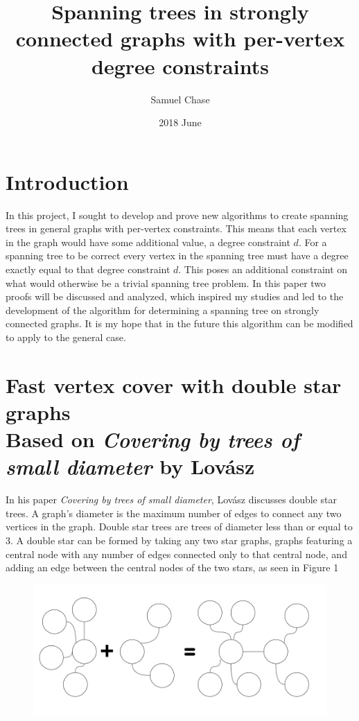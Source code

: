 \documentclass{article}
\title{Spanning trees in strongly connected graphs with per-vertex degree constraints}
\date{2018 June}
\author{Samuel Chase}
\begin{document}
	\maketitle
	\section{Introduction}
	In this project, I sought to develop and prove new algorithms to create spanning trees in general graphs with per-vertex constraints. 
	This means that each vertex in the graph would have some additional value, a degree constraint $d$. For a spanning tree to be correct every vertex in the spanning tree must have a degree exactly equal to that degree constraint $d$. This poses an additional constraint on what
	would otherwise be a trivial spanning tree problem. In this paper two proofs will be discussed and analyzed, which inspired my studies and led to the development of the algorithm for determining a spanning tree on strongly connected graphs. It is my hope that in the future this algorithm can be modified to apply to the general case.
	
	
	
	\section{Fast vertex cover with double star graphs \\ {\large Based on \textit{Covering by trees of small diameter} by Lov\'asz}}
	In his paper \textit{Covering by trees of small diameter}, Lov\'asz discusses double star trees. A graph's diameter is the maximum number of edges to connect any two vertices in the graph. Double star trees are trees of diameter less than or equal to 3. A double star can be formed by taking any two star graphs, graphs featuring a central node with any number of edges connected only to that central node, and adding an edge between the central nodes of the two stars, as seen in Figure 1
	\begin{figure}[h]
		\caption{}
		\includegraphics{Figure1}
	\end{figure}
	
\end{document}
